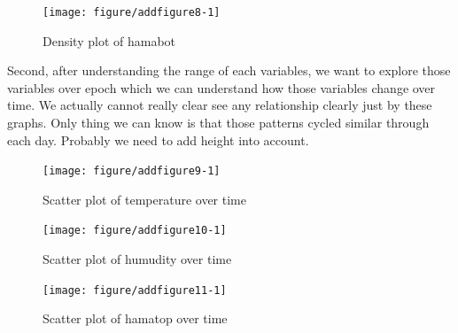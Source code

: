 \documentclass{article}\usepackage[]{graphicx}\usepackage[]{color}
\newenvironment{knitrout}{}{} %
\begin{document}
\begin{knitrout}
\color{fgcolor}\begin{figure}[h!]

{\centering \texttt{[image: figure/addfigure8-1]} 

}

\caption[Density plot of hamabot]{Density plot of hamabot}\label{fig:addfigure8}
\end{figure}


\end{knitrout}

Second, after understanding the range of each variables, we want to explore those variables over epoch which we can understand how those variables change over time. We actually cannot really clear see any relationship clearly just by these graphs. Only thing we can know is that those patterns cycled similar through each day.
Probably we need to add height into account.
\begin{knitrout}
\color{fgcolor}\begin{figure}[h!]

{\centering \texttt{[image: figure/addfigure9-1]} 

}

\caption[Scatter plot of temperature over time]{Scatter plot of temperature over time}\label{fig:addfigure9}
\end{figure}


\end{knitrout}

\begin{knitrout}
\color{fgcolor}\begin{figure}[h!]

{\centering \texttt{[image: figure/addfigure10-1]} 

}

\caption[Scatter plot of humudity over time]{Scatter plot of humudity over time}\label{fig:addfigure10}
\end{figure}


\end{knitrout}

\begin{knitrout}
\color{fgcolor}\begin{figure}[h!]

{\centering \texttt{[image: figure/addfigure11-1]} 

}

\caption[Scatter plot of hamatop over time]{Scatter plot of hamatop over time}\label{fig:addfigure11}
\end{figure}


\end{knitrout}
\end{document}
